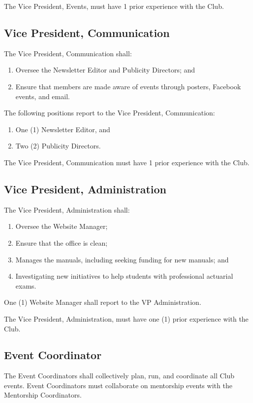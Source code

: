 \documentclass[11pt]{mathsoc}
\begin{document}
The Vice President, Events, must have 1 prior experience with the Club.

\subsection{Vice President, Communication}
The Vice President, Communication shall:
\begin{enumerate}
    \item Oversee the Newsletter Editor and Publicity Directors; and
    \item Ensure that members are made aware of events through posters, 
        Facebook events, and email. 
\end{enumerate}

The following positions report to the Vice President, Communication:
\begin{enumerate}
    \item One (1) Newsletter Editor, and
    \item Two (2) Publicity Directors.
\end{enumerate}

The Vice President, Communication must have 1 prior experience with the Club.

\subsection{Vice President, Administration}
The Vice President, Administration shall:
\begin{enumerate}
    \item Oversee the Website Manager; 
    \item Ensure that the office is clean; 
    \item Manages the manuals, including seeking funding for new manuals; 
        and
    \item Investigating new initiatives to help students with professional 
        actuarial exams. 
\end{enumerate}

One (1) Website Manager shall report to the VP Administration.

The Vice President, Administration, must have one (1) prior experience with the Club.

\subsection{Event Coordinator} 

The Event Coordinators shall collectively plan, run, and coordinate all Club 
events. Event Coordinators must collaborate on mentorship events with 
the Mentorship Coordinators.
\end{document}
